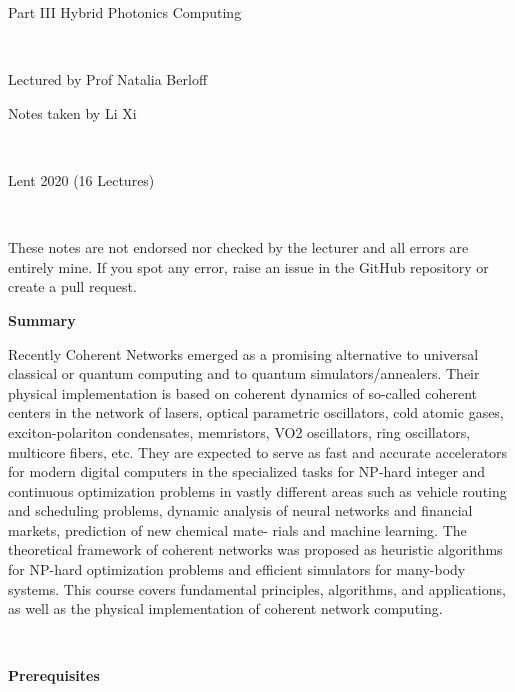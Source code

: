 \documentclass{article}
\begin{document}
    \begin{titlepage}
        \vfill
        \begin{center}

          {\huge Part III Hybrid Photonics Computing \par}
          
          \
          
          \Large Lectured by Prof Natalia Berloff 
          
          \large Notes taken by Li Xi

          \ 

          Lent 2020 (16 Lectures)

          \

          \normalsize
          These notes are not endorsed nor checked by the lecturer and all errors are entirely mine. If you spot any error, raise an issue in the GitHub repository or create a pull request. 
          
        \end{center}
        
        \vfill

        \begin{flushleft}
          \Large \textbf{Summary}
        \end{flushleft}
        
        \noindent Recently Coherent Networks emerged as a promising alternative to universal classical or quantum computing and to quantum simulators/annealers. Their physical implementation is based on coherent dynamics of so-called coherent centers in the network of lasers, optical parametric oscillators, cold atomic gases, exciton-polariton condensates, memristors, VO2 oscillators, ring oscillators, multicore fibers, etc. They are expected to serve as fast and accurate accelerators for modern digital computers in the specialized tasks for NP-hard integer and continuous optimization problems in vastly different areas such as vehicle routing and scheduling problems, dynamic analysis of neural networks and financial markets, prediction of new chemical mate- rials and machine learning. The theoretical framework of coherent networks was proposed as heuristic algorithms for NP-hard optimization problems and efficient simulators for many-body systems. This course covers fundamental principles, algorithms, and applications, as well as the physical implementation of coherent network computing.

        \

        \begin{flushleft}
          \Large \textbf{Prerequisites}
        \end{flushleft}


\end{titlepage}
\end{document}
